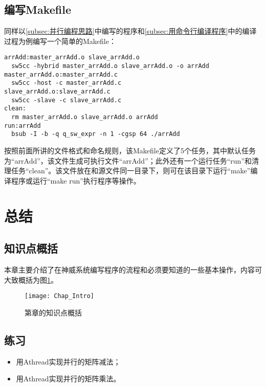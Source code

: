 \subsection{编写Makefile}
同样以\ref{subsec:并行编程思路}中编写的程序和\ref{subsec:用命令行编译程序}中的编译过程为例编写一个简单的Makefile：
\begin{lstlisting}
arrAdd:master_arrAdd.o slave_arrAdd.o
  sw5cc -hybrid master_arrAdd.o slave_arrAdd.o -o arrAdd
master_arrAdd.o:master_arrAdd.c
  sw5cc -host -c master_arrAdd.c
slave_arrAdd.o:slave_arrAdd.c
  sw5cc -slave -c slave_arrAdd.c
clean:
  rm master_arrAdd.o slave_arrAdd.o arrAdd
run:arrAdd
  bsub -I -b -q q_sw_expr -n 1 -cgsp 64 ./arrAdd
\end{lstlisting}
按照前面所讲的文件格式和命名规则，该Makefile定义了5个任务，其中默认任务为“arrAdd”，该文件生成可执行文件“arrAdd”；此外还有一个运行任务“run”和清理任务“clean”。该文件放在和源文件同一目录下，则可在该目录下运行“make”编译程序或运行“make run”执行程序等操作。

\section{总结}
\subsection{知识点概括}
本章主要介绍了在神威系统编写程序的流程和必须要知道的一些基本操作，内容可大致概括为图\ref{fig:Chap_Intro}。

\begin{figure}[!htbp]
  \centering
  \texttt{[image: Chap\_Intro]}
  \caption{第\thechapter{}章的知识点概括}
  \label{fig:Chap_Intro}
\end{figure}

\subsection{练习}
\begin{itemize}
  \item 用Athread实现并行的矩阵减法；
  \item 用Athread实现并行的矩阵乘法。
\end{itemize}
